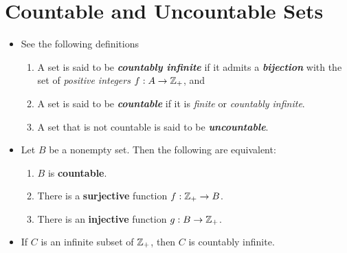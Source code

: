 \documentclass[11pt]{article}
\begin{document}
\section{Countable and Uncountable Sets}
\begin{itemize}
\item \begin{definition} See the following definitions
\begin{enumerate}
\item A set is said to be \emph{\textbf{countably infinite}} if it admits a \emph{\textbf{bijection}} with the set of \emph{positive integers} $f: A \rightarrow {\mathbb Z}_{+}$, and 
\item A set is said to be \emph{\textbf{countable}} if it is \emph{finite} or \emph{countably infinite}. 
\item A set that is not countable is said to be \emph{\textbf{uncountable}}.
\end{enumerate}
\end{definition}

\item \begin{proposition}
Let $B$ be a nonempty set. Then the following are equivalent:
\begin{enumerate}
\item $B$ is \textbf{countable}.
\item There is a \textbf{surjective} function $f: {\mathbb Z}_{+} \rightarrow B$.
\item There is an \textbf{injective} function $g : B  \rightarrow {\mathbb Z}_{+}$.
\end{enumerate}
\end{proposition}

\item \begin{lemma}
If $C$ is an infinite subset of ${\mathbb Z}_{+}$, then $C$ is countably infinite.
\end{lemma}
\end{itemize}
\end{document}
